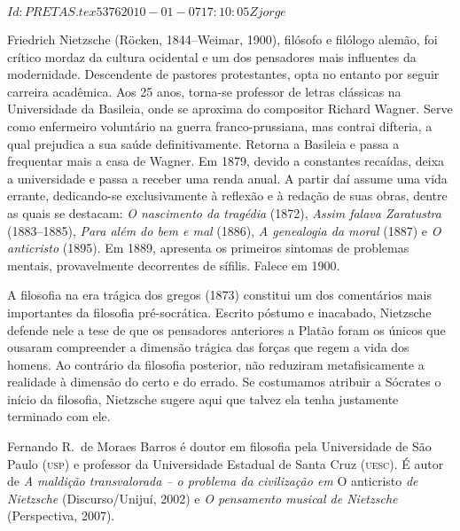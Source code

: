 \SVN $Id: PRETAS.tex 5376 2010-01-07 17:10:05Z jorge $
\begin{resumopage}
\item[Friedrich Nietzsche] (Röcken, 1844--Weimar, 1900), filósofo 
e filólogo alemão, foi crítico mordaz da cultura ocidental 
e um dos pensadores mais influentes da modernidade. Descendente de pastores 
protestantes, opta no entanto por seguir carreira acadêmica. 
Aos 25 anos, torna-se professor de letras clássicas na Universidade 
da Basileia, onde se aproxima do compositor Richard Wagner. Serve 
como enfermeiro voluntário na guerra franco-prussiana, mas contrai 
difteria, a qual prejudica a sua saúde definitivamente. Retorna a 
Basileia e passa a frequentar mais a casa de Wagner. Em 
1879, devido a constantes recaídas, deixa a universidade e passa a 
receber uma renda anual. A partir daí assume uma vida errante, 
dedicando-se exclusivamente à reflexão e à redação de suas obras, 
dentre as quais se destacam: \textit{O nascimento da tragédia} (1872), 
\textit{Assim falava Zaratustra} (1883--1885), \textit{Para além do bem e mal} (1886), 
\textit{A genealogia da moral} (1887) e \textit{O anticristo} (1895). Em 1889, 
apresenta os primeiros sintomas de problemas mentais, provavelmente 
decorrentes de sífilis. Falece em 1900.

\item[A filosofia na era trágica dos gregos] (1873) constitui um dos comentários 
mais importantes da filosofia pré{}-socrática. Escrito póstumo e inacabado, Nietzsche defende nele 
a tese de que os pensadores anteriores a Platão foram os únicos que ousaram compreender a dimensão 
trágica das forças que regem a vida dos homens. Ao contrário da filosofia posterior, não reduziram 
metafisicamente a realidade à dimensão do certo e do errado. Se costumamos atribuir a Sócrates o início 
da filosofia, Nietzsche sugere aqui que talvez ela tenha justamente terminado com ele.

\item[Fernando R.~de Moraes Barros] é doutor em filosofia pela Universidade 
de São Paulo (\textsc{usp}) e professor da Universidade Estadual de Santa Cruz 
(\textsc{uesc}). É autor de \textit{A maldição transvalorada -- o problema da civilização 
em} O anticristo \textit{de Nietzsche} (Discurso/Unijuí, 2002) 
e \textit{O pensamento musical de Nietzsche} (Perspectiva, 2007).

\end{resumopage}
